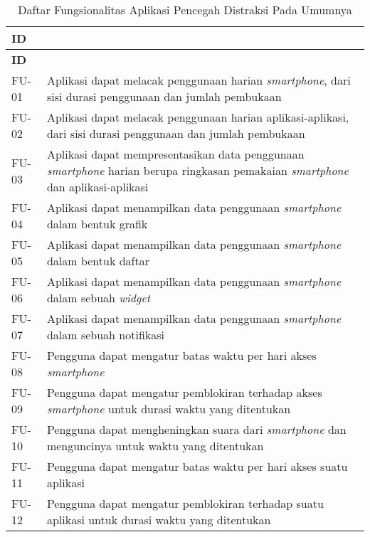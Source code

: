 \RaggedLeft
\begin{small}
\begin{longtable}[c]{|W{c}{0.08\textwidth}|>{\ccnormspacing}m{0.82\textwidth}|}
  \caption{Daftar Fungsionalitas Aplikasi Pencegah Distraksi Pada Umumnya}
  \label{tab:daftar_fungsionalitas_app_umum} \\
  \hline {} \textbf{ID} &  \\ \hline \endfirsthead
  \hline {} \textbf{ID} &  \\ \hline \endhead
  
  \hline \endfoot
  
  FU-01  &  Aplikasi dapat melacak penggunaan harian \textit{smartphone}, dari sisi durasi penggunaan dan jumlah pembukaan \\ \hline
  FU-02  &  Aplikasi dapat melacak penggunaan harian aplikasi-aplikasi, dari sisi durasi penggunaan dan jumlah pembukaan \\ \hline
  FU-03  &  Aplikasi dapat mempresentasikan data penggunaan \textit{smartphone} harian berupa ringkasan pemakaian \textit{smartphone} dan aplikasi-aplikasi \\ \hline
  FU-04  &  Aplikasi dapat menampilkan data penggunaan \textit{smartphone} dalam bentuk grafik \\ \hline
  FU-05  &  Aplikasi dapat menampilkan data penggunaan \textit{smartphone} dalam bentuk daftar \\ \hline
  FU-06  &  Aplikasi dapat menampilkan data penggunaan \textit{smartphone} dalam sebuah \textit{widget} \\ \hline
  FU-07  &  Aplikasi dapat menampilkan data penggunaan \textit{smartphone} dalam sebuah notifikasi \\ \hline
  FU-08  &  Pengguna dapat mengatur batas waktu per hari akses \textit{smartphone} \\ \hline
  FU-09  &  Pengguna dapat mengatur pemblokiran terhadap akses \textit{smartphone} untuk durasi waktu yang ditentukan \\ \hline
  FU-10  &  Pengguna dapat mengheningkan suara dari \textit{smartphone} dan menguncinya untuk waktu yang ditentukan \\ \hline
  FU-11  &  Pengguna dapat mengatur batas waktu per hari akses suatu aplikasi \\ \hline
  FU-12  &  Pengguna dapat mengatur pemblokiran terhadap suatu aplikasi untuk durasi waktu yang ditentukan \\ \hline

\end{longtable}
\end{small}
